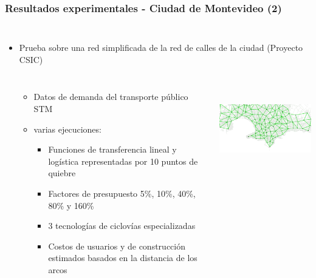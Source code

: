 \documentclass[aspectratio=43, 10pt]{beamer}
\begin{document}
\begin{frame}
    \frametitle{Resultados experimentales - Ciudad de Montevideo (2)}

    \begin{columns}[T]
        \begin{itemize}
            \item{
                Prueba sobre una red simplificada de la red de calles de la ciudad (Proyecto CSIC)
                \begin{columns}[T]
                    \begin{itemize}
                    \item{Datos de demanda del transporte público STM
                        \parencite{Massobrio2020}}
                    \item{varias ejecuciones:
                        \begin{itemize}
                            \item{Funciones de transferencia lineal y logística representadas por 10 puntos de quiebre}
                            \item{Factores de presupuesto 5\%, 10\%, 40\%, 80\% y 160\%}
                            \item{3 tecnologías de ciclovías especializadas}
                            \item{Costos de usuarios y de construcción estimados basados en la distancia de los arcos}
                        \end{itemize}
                    }
                    \end{itemize}
                    \begin{center}
                        \includegraphics[height=4cm]{images/mvd_red.png}
                    \end{center}
                \end{columns}
            }
        \end{itemize}
    \end{columns}
\end{frame}
\end{document}

